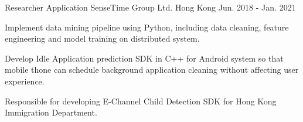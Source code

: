 \begin{cventries}
  \cventry
    {Researcher Application} %
    {SenseTime Group Ltd.} %
    {Hong Kong} %
    {Jun. 2018 - Jan. 2021} %
    {
      \begin{cvitems} %
        \item {Implement data mining pipeline using Python, including data cleaning, feature engineering and model training on distributed system.}
        \item {Develop Idle Application prediction SDK in C++ for Android system so that mobile thone can schedule background application cleaning without affecting user experience.}
        \item {Responsible for developing E-Channel Child Detection SDK for Hong Kong Immigration Department.}
      \end{cvitems}
    }
\end{cventries}
